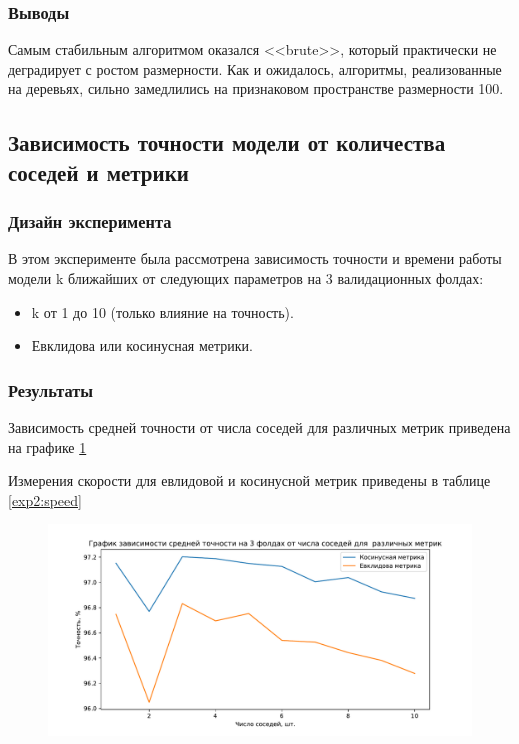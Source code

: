 \documentclass[a4paper, 12pt]{article}
\begin{document}
    \subsubsection{Выводы}
    Самым стабильным алгоритмом оказался <<brute>>, который практически не деградирует с ростом размерности. Как и ожидалось, алгоритмы, реализованные на деревьях, сильно замедлились на признаковом пространстве размерности 100.
    
    \subsection{Зависимость точности модели от количества соседей и метрики}
    \subsubsection{Дизайн эксперимента}
    В этом эксперименте была рассмотрена зависимость точности и времени работы модели k ближайших от следующих параметров на 3 валидационных фолдах:
    \begin{itemize}
        \item k от 1 до 10 (только влияние на точность).
        \item Евклидова или косинусная метрики.
    \end{itemize}
    
    
    \subsubsection{Результаты}
        Зависимость средней точности от числа соседей для различных метрик приведена на графике \ref{exp2:graph}
        
        Измерения скорости для евлидовой и косинусной метрик приведены в таблице \ref{exp2:speed}
    \begin{figure}
        \caption{}\label{exp2:graph}
        \includegraphics[width=\textwidth]{../experiment2_graph.pdf}
    \end{figure} 
    
\end{document}
